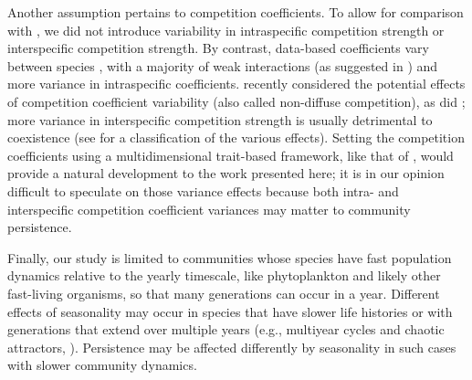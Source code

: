 \documentclass[a4paper,12pt]{article}
\begin{document}
Another assumption pertains to competition coefficients. To allow
for comparison with \citet{scranton_coexistence_2016}, we did not
introduce variability in intraspecific competition strength or interspecific
competition strength. By contrast, data-based coefficients vary between
species \citep{barraquand2018coastal}, with a majority of weak interactions
(as suggested in \citealp{wootton_measurement_2005}) and more variance
in intraspecific coefficients. \citet{stump_multispecies_2017} recently
considered the potential effects of competition coefficient variability
(also called non-diffuse competition), as did \citet{kokkoris_variability_2002};
more variance in interspecific competition strength is usually detrimental
to coexistence (see \citet{stump_multispecies_2017} for a classification
of the various effects). Setting the competition coefficients using
a multidimensional trait-based framework, like that of \citet{ashby_competing_2017},
would provide a natural development to the work presented here; it
is in our opinion difficult to speculate on those variance effects
because both intra- and interspecific competition coefficient variances
may matter to community persistence. 

Finally, our study is limited to communities whose species have fast
population dynamics relative to the yearly timescale, like phytoplankton
and likely other fast-living organisms, so that many generations can
occur in a year. Different effects of seasonality may occur in species
that have slower life histories or with generations that extend over
multiple years (e.g., multiyear cycles and chaotic attractors, \citealt{rinaldi_multiple_1993,taylor_how_2013,tyson_seasonally_2016}).
Persistence may be affected differently by seasonality in such cases
with slower community dynamics. 
\end{document}
